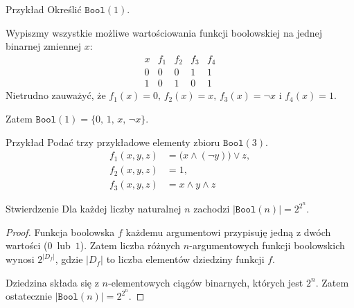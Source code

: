 \documentclass[a4paper,10pt]{beamer}
\begin{document}
\begin{frame}
	
	\begin{exampleblock}{Przykład}
		Określić $\mathtt{Bool}(1)$.
		
		Wypiszmy wszystkie możliwe wartościowania funkcji boolowskiej na jednej binarnej zmiennej $x$:
		$$\begin{array}{c||c|c|c|c}x&f_1&f_2&f_3&f_4\\\hline0&0&0&1&1\\1&0&1&0&1\end{array}$$
		Nietrudno zauważyć, że $f_1(x)=0,\, f_2(x)=x,\, f_3(x)=\neg x$ i $f_4(x)=1$.
		
		Zatem $\mathtt{Bool}(1)=\{0,\,1,\,x,\,\neg x\}$.
	\end{exampleblock}

		\begin{exampleblock}{Przykład}
		Podać trzy przykładowe elementy zbioru $\mathtt{Bool}(3)$.
		\begin{align*}
			f_1(x,y,z)&=\big(x\wedge (\neg y)\big)\vee z,\\
			f_2(x,y,z)&=1,\\
			f_3(x,y,z)&=x\wedge y\wedge z
		\end{align*}
	\end{exampleblock}
	
\end{frame}



\begin{frame}
	
	\begin{block}{Stwierdzenie}
		Dla każdej liczby naturalnej $n$ zachodzi $|\mathtt{Bool}(n)|=2^{2^n}$. 
	\end{block}

	\begin{proof}
		Funkcja boolowska $f$ każdemu argumentowi przypisuję jedną z dwóch wartości ($0$~lub~$1$). Zatem liczba różnych $n$-argumentowych funkcji boolowskich wynosi $2^{|D_f|}$, gdzie $|D_f|$ to liczba elementów dziedziny funkcji $f$.
		
		Dziedzina składa się z $n$-elementowych ciągów binarnych, których jest $2^n$. Zatem ostatecznie $|\mathtt{Bool}(n)|=2^{2^n}$.
	\end{proof}
	
\end{frame}
\end{document}
